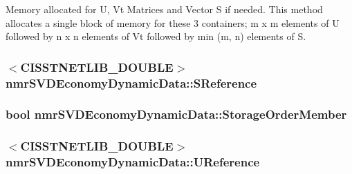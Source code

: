 Memory allocated for U, Vt Matrices and Vector S if needed. This method allocates a single block of memory for these 3 containers; m x m elements of U followed by n x n elements of Vt followed by min (m, n) elements of S. \hypertarget{classnmr_s_v_d_economy_dynamic_data_a5f21313bc7280084d7855b4a772960d7}{
\subsubsection[{S\-Reference}]{$<$C\-I\-S\-S\-T\-N\-E\-T\-L\-I\-B\-\_\-\-D\-O\-U\-B\-L\-E$>$ nmr\-S\-V\-D\-Economy\-Dynamic\-Data\-::\-S\-Reference\hspace{0.3cm}{\ttfamily [protected]}}}\label{classnmr_s_v_d_economy_dynamic_data_a5f21313bc7280084d7855b4a772960d7}
\hypertarget{classnmr_s_v_d_economy_dynamic_data_afd61787cd2b1d49a68fe80d55c912f7a}{
\subsubsection[{Storage\-Order\-Member}]{\setlength{\rightskip}{0pt plus 5cm}bool nmr\-S\-V\-D\-Economy\-Dynamic\-Data\-::\-Storage\-Order\-Member\hspace{0.3cm}{\ttfamily [protected]}}}\label{classnmr_s_v_d_economy_dynamic_data_afd61787cd2b1d49a68fe80d55c912f7a}
\hypertarget{classnmr_s_v_d_economy_dynamic_data_ab6a5af5bd7884ddd590aef7ad83d1194}{
\subsubsection[{U\-Reference}]{$<$C\-I\-S\-S\-T\-N\-E\-T\-L\-I\-B\-\_\-\-D\-O\-U\-B\-L\-E$>$ nmr\-S\-V\-D\-Economy\-Dynamic\-Data\-::\-U\-Reference\hspace{0.3cm}{\ttfamily [protected]}}}\label{classnmr_s_v_d_economy_dynamic_data_ab6a5af5bd7884ddd590aef7ad83d1194}
